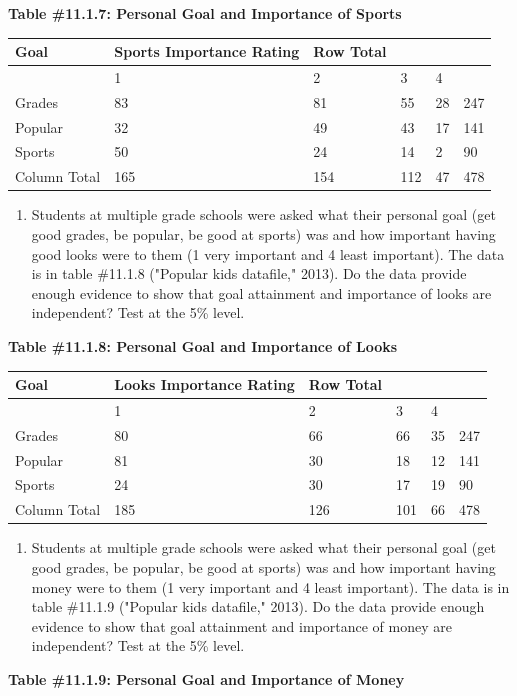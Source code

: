 \documentclass[
]{book}
\providecommand{\tightlist}{%
  \setlength{\itemsep}{0pt}\setlength{\parskip}{0pt}}
\begin{document}
\textbf{Table \#11.1.7: Personal Goal and Importance of Sports}

\begin{longtable}[]{@{}llllll@{}}
\toprule
Goal & Sports Importance Rating & Row Total & & &\tabularnewline
\midrule
\endhead
& 1 & 2 & 3 & 4 &\tabularnewline
Grades & 83 & 81 & 55 & 28 & 247\tabularnewline
Popular & 32 & 49 & 43 & 17 & 141\tabularnewline
Sports & 50 & 24 & 14 & 2 & 90\tabularnewline
Column Total & 165 & 154 & 112 & 47 & 478\tabularnewline
\bottomrule
\end{longtable}

\begin{enumerate}
\def\labelenumi{\arabic{enumi}.}
\setcounter{enumi}{6}
\tightlist
\item
  Students at multiple grade schools were asked what their personal goal (get good grades, be popular, be good at sports) was and how important having good looks were to them (1 very important and 4 least important). The data is in table \#11.1.8 ("Popular kids datafile," 2013). Do the data provide enough evidence to show that goal attainment and importance of looks are independent? Test at the 5\% level.
\end{enumerate}

\textbf{Table \#11.1.8: Personal Goal and Importance of Looks}

\begin{longtable}[]{@{}llllll@{}}
\toprule
Goal & Looks Importance Rating & Row Total & & &\tabularnewline
\midrule
\endhead
& 1 & 2 & 3 & 4 &\tabularnewline
Grades & 80 & 66 & 66 & 35 & 247\tabularnewline
Popular & 81 & 30 & 18 & 12 & 141\tabularnewline
Sports & 24 & 30 & 17 & 19 & 90\tabularnewline
Column Total & 185 & 126 & 101 & 66 & 478\tabularnewline
\bottomrule
\end{longtable}

\begin{enumerate}
\def\labelenumi{\arabic{enumi}.}
\setcounter{enumi}{7}
\tightlist
\item
  Students at multiple grade schools were asked what their personal goal (get good grades, be popular, be good at sports) was and how important having money were to them (1 very important and 4 least important). The data is in table \#11.1.9 ("Popular kids datafile," 2013). Do the data provide enough evidence to show that goal attainment and importance of money are independent? Test at the 5\% level.
\end{enumerate}

\textbf{Table \#11.1.9: Personal Goal and Importance of Money}
\end{document}
